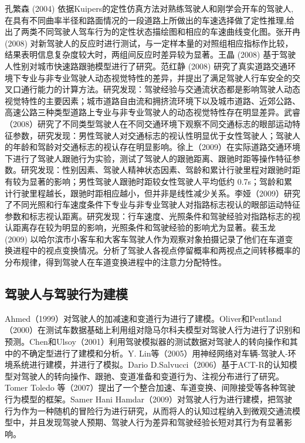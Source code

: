 孔繁森 (2004) 依据Kuipers的定性仿真方法对熟练驾驶人和刚学会开车的驾驶人,在具有不同曲率半径和路面情况的一段道路上所做出的车速选择做了定性推理,给出了两类不同驾驶人驾车行为的定性状态描绘图和相应的车速曲线变化图\cite{孔繁森2004}。张开冉 (2008) 对新驾驶人的反应时进行测试，与一定样本量的对照组相应指标作比较，结果表明信息复杂度较大时，两组间反应时差异较为显著\cite{张开冉2008}。王晶 (2008) 基于驾驶人性别对城市快速路跟驰模型进行了研究\cite{王晶2008}。范红静 (2008) 研究了真实道路交通环境下专业与非专业驾驶人动态视觉特性的差异，并提出了满足驾驶人行车安全的交叉口通行能力的计算方法。研究发现：驾驶经验与交通流状态都是影响驾驶人动态视觉特性的主要因素；城市道路自由流和拥挤流环境下以及城市道路、近郊公路、高速公路三种类型道路上专业与非专业驾驶人的动态视觉特性存在明显差异\cite{范红静2008}。武睿（2008）研究了不同类型驾驶人在不同交通环境下观察不同交通标志的眼部运动特征参数，研究发现：男性驾驶人对交通标志的视认性明显优于女性驾驶人；驾驶人的年龄和驾龄对交通标志的视认存在明显影响\cite{武睿2008}。徐上（2009）在实际道路交通环境下进行了驾驶人跟驰行为实验，测试了驾驶人的跟驰距离、跟驰时距等操作特征参数。研究发现：性别因素、驾驶人精神状态因素、驾龄和累计行驶里程对跟驰时距有较为显著的影响；男性驾驶人跟驰时距较女性驾驶人平均低约 0.7s；驾龄和累计行驶里程越长，跟驰时距相应越小，但并非是线性减少关系\cite{徐上2009}。李娅（2009）研究了不同光照和行车速度条件下专业与非专业驾驶人对指路标志视认的眼部运动特征参数和标志视认距离。研究发现：行车速度、光照条件和驾驶经验对指路标志的视认距离存在较为明显的影响，光照条件和驾驶经验的影响尤为显著\cite{李娅2009}。裴玉龙 (2009) 以哈尔滨市小客车和大客车驾驶人作为观察对象拍摄记录了他们在车道变换进程中的视点变换情况。分析了驾驶人各视点停留概率和两视点之间转移概率的分布规律，得到驾驶人在车道变换进程中的注意力分配特性\cite{裴玉龙2009}。

\subsection{驾驶人与驾驶行为建模}

Ahmed（1999）对驾驶人的加减速和变道行为进行了建模\cite{Ahmed1999}。Oliver和Pentland（2000）在测试车数据基础上利用组对隐马尔科夫模型对驾驶人行为进行了识别和预测\cite{Oliver2000}。Chen和Ulsoy（2001）利用驾驶模拟器的测试数据对驾驶人的转向操作和其中的不确定型进行了建模和分析\cite{Chen2001}。Y. Lin等（2005）用神经网络对车辆-驾驶人-环境系统进行建模，并进行了模拟\cite{Lin2005}。Dario D.Salvucci（2006）基于ACT-R的认知模型对驾驶人的转向操作、跟驰、变道准备和变道行为、注视分布进行了研究\cite{Salvucci2006}。Tomer Toledo 等（2007）提出了一个整合加速、车道变换、间隙接受等各种驾驶行为模型的框架\cite{Toledo2007}。Samer Hani Hamdar（2009）对驾驶人行为进行建模，把驾驶行为作为一种随机的冒险行为进行研究，从而将人的认知过程纳入到微观交通流模型中，并且发现驾驶人预期、驾驶人行为差异和驾驶经验长短对其行为有显著影响\cite{Hamdar2009a}。

